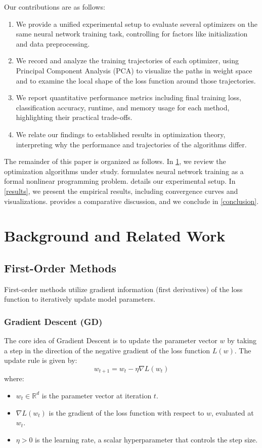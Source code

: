 \documentclass[20pt]{article}
\begin{document}
\clearpage
Our contributions are as follows:
\begin{enumerate}
\item We provide a unified experimental setup to evaluate several optimizers on the same neural network training task, controlling for factors like initialization and data preprocessing.
\item We record and analyze the training trajectories of each optimizer, using Principal Component Analysis (PCA) to visualize the paths in weight space and to examine the local shape of the loss function around those trajectories.
\item We report quantitative performance metrics including final training loss, classification accuracy, runtime, and memory usage for each method, highlighting their practical trade-offs.
\item We relate our findings to established results in optimization theory, interpreting why the performance and trajectories of the algorithms differ.
\end{enumerate}
The remainder of this paper is organized as follows. In \cref{background}, we review the optimization algorithms under study.  formulates neural network training as a formal nonlinear programming problem.  details our experimental setup. In \cref{results}, we present the empirical results, including convergence curves and visualizations.  provides a comparative discussion, and we conclude in \cref{conclusion}.

\clearpage

\section{Background and Related Work} \label{background}
\subsection{First-Order Methods}
First-order methods utilize gradient information (first derivatives) of the loss function to iteratively update model parameters.

\subsubsection{Gradient Descent (GD)}
The core idea of Gradient Descent \cite{Robbins1951SGD} is to update the parameter vector $w$ by taking a step in the direction of the negative gradient of the loss function $L(w)$. The update rule is given by:
\begin{equation}\label{eq:gd-update}
w_{t+1} = w_t - \eta \nabla L(w_t)
\end{equation}
where:
\begin{itemize}
    \item $w_t \in \mathbb{R}^d$ is the parameter vector at iteration $t$.
    \item $\nabla L(w_t)$ is the gradient of the loss function with respect to $w$, evaluated at $w_t$.
    \item $\eta > 0$ is the learning rate, a scalar hyperparameter that controls the step size.
\end{itemize}
\end{document}
